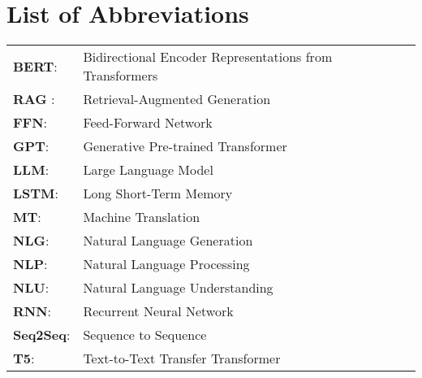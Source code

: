 \chapter*{List of Abbreviations }
\pagestyle{fancy}
\pagestyle{fancy}
\pagestyle{fancy}\rhead{\textbf \footnotesize\it{}}

\begin{tabular}{ll}

	\textbf{BERT}:& Bidirectional Encoder Representations from Transformers\\
	\textbf{RAG} :& Retrieval-Augmented Generation\\
	\textbf{FFN}:& Feed-Forward Network\\
	\textbf{GPT}:& Generative Pre-trained Transformer\\
	\textbf{LLM}:& Large Language Model\\
	\textbf{LSTM}:& Long Short-Term Memory\\
	\textbf{MT}:& Machine Translation\\
	\textbf{NLG}:& Natural Language Generation\\
	\textbf{NLP}:& Natural Language Processing\\
	\textbf{NLU}:& Natural Language Understanding\\
	\textbf{RNN}:& Recurrent Neural Network\\
	\textbf{Seq2Seq}:& Sequence to Sequence\\
	\textbf{T5}:& Text-to-Text Transfer Transformer\\
\end{tabular}
